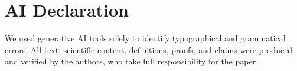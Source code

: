 \documentclass{article}
\begin{document}
\section*{AI Declaration}
We used generative AI tools solely to identify typographical and grammatical errors. All text, scientific content, definitions, proofs, and claims were produced and verified by the authors, who take full responsibility for the paper. 






 


\ifarxiv
\clearpage 
\fi
\end{document}
